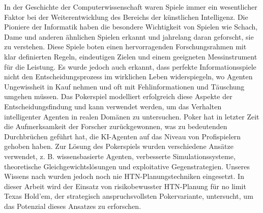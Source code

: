 In der Geschichte der Computerwissenschaft waren Spiele immer ein wesentlicher Faktor bei der Weiterentwicklung des Bereichs der künstlichen Intelligenz. Die Pioniere der Informatik haben die besondere Wichtigkeit von Spielen wie Schach, Dame und anderen ähnlichen Spielen erkannt und jahrelang daran geforscht, sie zu verstehen. Diese Spiele boten einen hervorragenden Forschungsrahmen mit klar definierten Regeln, eindeutigen Zielen und einem geeigneten Messinstrument für die Leistung. Es wurde jedoch auch erkannt, dass perfekte Informationsspiele nicht den Entscheidungsprozess im wirklichen Leben widerspiegeln, wo Agenten Ungewissheit in Kauf nehmen und oft mit Fehlinformationen und Täuschung umgehen müssen. Das Pokerspiel modelliert erfolgreich diese Aspekte der Entscheidungsfindung und kann verwendet werden, um das Verhalten intelligenter Agenten in realen Domänen zu untersuchen. Poker hat in letzter Zeit die Aufmerksamkeit der Forscher zurückgewonnen, was zu bedeutenden Durchbrüchen geführt hat, die KI-Agenten auf das Niveau von Profispielern gehoben haben. Zur Lösung des Pokerspiels wurden verschiedene Ansätze verwendet, z. B. wissensbasierte Agenten, verbesserte Simulationssysteme, theoretische Gleichgewichtslösungen und exploitative Gegenstrategien. Unseres Wissens nach wurden jedoch noch nie HTN-Planungstechniken eingesetzt. In dieser Arbeit wird der Einsatz von risikobewusster HTN-Planung für no limit Texas Hold'em, der strategisch anspruchsvollsten Pokervariante, untersucht, um das Potenzial dieses Ansatzes zu erforschen.